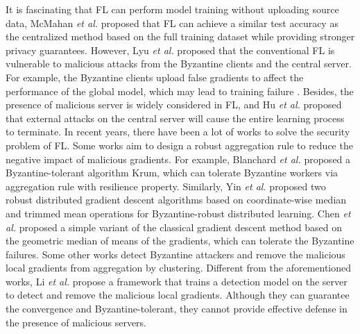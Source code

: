 \documentclass[10pt,journal,compsoc]{IEEEtran}
\newcommand{\etal}{\emph{et al.} }
\begin{document}
It is fascinating that FL can perform model training without uploading source data, McMahan \etal \cite{McMahanMRHA17} proposed that FL can achieve a similar test accuracy as the centralized method based on the full training dataset while providing stronger privacy guarantees. However, Lyu \etal \cite{DBLP:journals/corr/abs-2003-02133} proposed that the conventional FL is vulnerable to malicious attacks from the Byzantine clients and the central server. For example, the Byzantine clients upload false gradients to affect the performance of the global model, which may lead to training failure \cite{Blanchard2017Byzantine}\cite{247652}. Besides, the presence of malicious server is widely considered in FL\cite{8737416}\cite{9293091}\cite{DBLP:journals/corr/BonawitzIKMMPRS16}\cite{DBLP:journals/corr/abs-2109-14236}, and Hu \etal \cite{abs-2010-10996} proposed that external attacks on the central server will cause the entire learning process to terminate. In recent years, there have been a lot of works to solve the security problem of FL. Some works aim to design a robust aggregation rule to reduce the negative impact of malicious gradients\cite{munozgonzalez2019byzantinerobust}. For example, Blanchard \etal \cite{Blanchard2017Byzantine} proposed a Byzantine-tolerant algorithm Krum, which can tolerate Byzantine workers via aggregation rule with resilience property. Similarly, Yin \etal \cite{pmlr-v80-yin18a} proposed two robust distributed gradient descent algorithms based on coordinate-wise median and trimmed mean operations for Byzantine-robust distributed learning. Chen \etal \cite{10.1145/3154503} proposed a simple variant of the classical gradient descent method based on the geometric median of means of the gradients, which can tolerate the Byzantine failures. Some other works detect Byzantine attackers and remove the malicious local gradients from aggregation by clustering\cite{9054676}\cite{yadav2021clustering}. Different from the aforementioned works, Li \etal \cite{li2020learning} propose a framework that trains a detection model on the server to detect and remove the malicious local gradients. Although they can guarantee the convergence and Byzantine-tolerant, they cannot provide effective defense in the presence of malicious servers\cite{kairouz2021advances}.  

\end{document}
